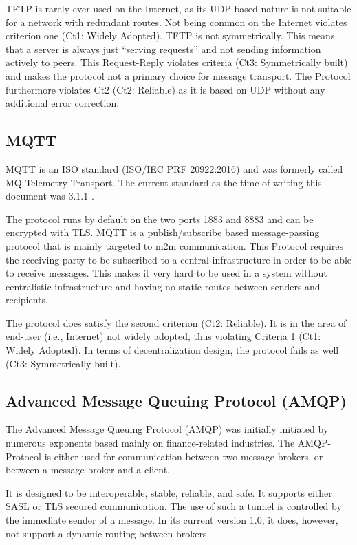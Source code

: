 \documentclass[a4paper,appendixprefix,pdfusetitle,twocolumn,fontsize=8pt,DIV=calc,8pt,draft]{\doctype} %
\begin{document}
TFTP is rarely ever used on the Internet, as its UDP based nature is not suitable for a network with redundant routes. Not being common on the Internet violates criterion one (Ct1: Widely Adopted). TFTP is not symmetrically. This means that a server is always just ``serving requests'' and not sending information actively to peers. This Request-Reply violates criteria (Ct3: Symmetrically built) and makes the protocol not a primary choice for message transport. The Protocol furthermore violates Ct2 (Ct2: Reliable) as it is based on UDP without any additional error correction.

\subsection{MQTT}
MQTT is an ISO standard (ISO/IEC PRF 20922:2016) and was formerly called MQ Telemetry Transport. The current standard as the time of writing this document was 3.1.1 \cite{mqtt}. 

The protocol runs by default on the two ports 1883 and 8883 and can be encrypted with TLS. MQTT is a publish/subscribe based message-passing protocol that is mainly targeted to m2m communication. This Protocol requires the receiving party to be subscribed to a central infrastructure in order to be able to receive messages. This makes it very hard to be used in a system without centralistic infrastructure and having no static routes between senders and recipients. 

The protocol does satisfy the second criterion (Ct2: Reliable). It is in the area of end-user (i.e., Internet) not widely adopted, thus violating Criteria 1 (Ct1: Widely Adopted). In terms of decentralization design, the protocol fails as well (Ct3: Symmetrically built).

\subsection{Advanced Message Queuing Protocol (AMQP)}
The Advanced Message Queuing Protocol (AMQP) was initially initiated by numerous exponents based mainly on finance-related industries. The AMQP-Protocol is either used for communication between two message brokers, or between a message broker and a client\cite{amqp}.

It is designed to be interoperable, stable, reliable, and safe. It supports either SASL or TLS secured communication. The use of such a tunnel is controlled by the immediate sender of a message. In its current version 1.0, it does, however, not support a dynamic routing between brokers\cite{amqp}.
\end{document}
